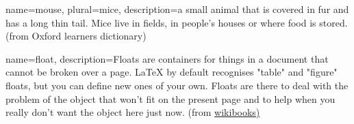 \makeglossaries
{}
{
        name=mouse,
        plural=mice,
        description={a small animal that is covered in fur and has a long thin tail. Mice live in fields, in people’s houses or where food is stored. (from Oxford learners dictionary)}
}

{
        name=float,
        description={Floats are containers for things in a document that cannot be broken over a page. LaTeX by default recognises "table" and "figure" floats, but you can define new ones of your own. Floats are there to deal with the problem of the object that won't fit on the present page and to help when you really don't want the object here just now. (from \href{https://en.wikibooks.org/wiki/LaTeX/Floats,_Figures_and_Captions}{wikibooks)}}
}